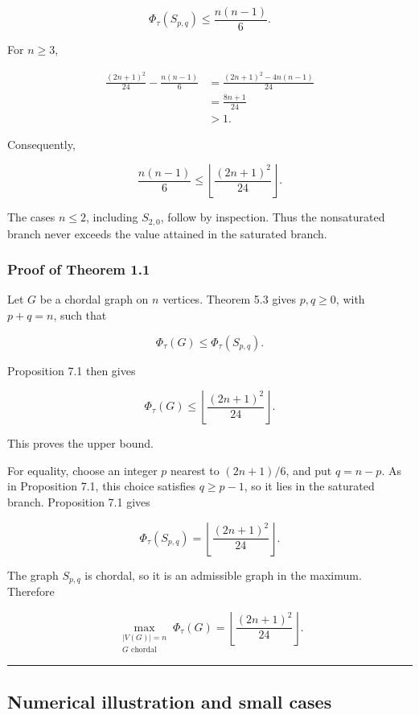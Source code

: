 \documentclass[
  11pt,
]{article}
\begin{document}
\[
\Phi_\tau(S_{p,q})
\le
\frac{n(n-1)}6.
\]

For \(n\ge3\),

\[
\begin{aligned}
\frac{(2n+1)^2}{24}
-
\frac{n(n-1)}6
&=
\frac{(2n+1)^2-4n(n-1)}{24}\\
&=
\frac{8n+1}{24}\\
&>1.
\end{aligned}
\]

Consequently,

\[
\frac{n(n-1)}6
\le
\left\lfloor\frac{(2n+1)^2}{24}\right\rfloor.
\]

The cases \(n\le2\), including \(S_{2,0}\), follow by inspection. Thus
the nonsaturated branch never exceeds the value attained in the
saturated branch.

\subsubsection{Proof of Theorem 1.1}\label{proof-of-theorem-1.1}

Let \(G\) be a chordal graph on \(n\) vertices. Theorem 5.3 gives
\(p,q\ge0\), with \(p+q=n\), such that

\[
\Phi_\tau(G)\le\Phi_\tau(S_{p,q}).
\]

Proposition 7.1 then gives

\[
\Phi_\tau(G)
\le
\left\lfloor\frac{(2n+1)^2}{24}\right\rfloor.
\]

This proves the upper bound.

For equality, choose an integer \(p\) nearest to \((2n+1)/6\), and put
\(q=n-p\). As in Proposition 7.1, this choice satisfies \(q\ge p-1\), so
it lies in the saturated branch. Proposition 7.1 gives

\[
\Phi_\tau(S_{p,q})
=
\left\lfloor\frac{(2n+1)^2}{24}\right\rfloor.
\]

The graph \(S_{p,q}\) is chordal, so it is an admissible graph in the
maximum. Therefore

\[
\max_{\substack{|V(G)|=n\\G\text{ chordal}}}
\Phi_\tau(G)
=
\left\lfloor\frac{(2n+1)^2}{24}\right\rfloor.
\]

\begin{center}\rule{0.5\linewidth}{0.5pt}\end{center}

\subsection{Numerical illustration and small
cases}\label{numerical-illustration-and-small-cases}
\end{document}

